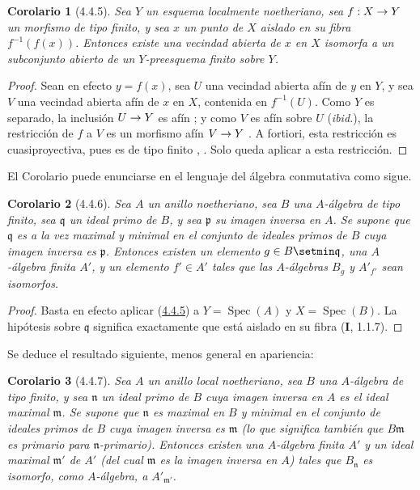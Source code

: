 \documentclass[10pt,oneside,openany]{book}
\theoremstyle{egaenv}\newtheorem*{env}{---}
\theoremstyle{egastatement}
\newtheorem*{corollary}{Corolario}
\theoremstyle{egadescription}
\newcommand{\oldpage}[2][]{\marginnote{\normalfont\scriptsize\textbf{#1}\,|\,#2}\ignorespaces}
\renewcommand{\to}{\mathchoice{\longrightarrow}{\rightarrow}{\rightarrow}{\rightarrow}}
\begin{document}
\begin{corollary}[4.4.5]
\label{III.4.4.5}
\label{III.4.4.5-fr}
Sea $Y$ un esquema localmente noetheriano, sea $f:X\to Y$ un
morfismo de tipo finito, y sea $x$ un punto de $X$ aislado en su fibra
$f^{-1}(f(x))$. Entonces existe una vecindad abierta de $x$ en $X$
isomorfa a un subconjunto abierto de un $Y$-preesquema finito sobre $Y$.
\end{corollary}

\begin{proof}
Sean en efecto $y=f(x)$, sea $U$ una vecindad abierta afín de $y$ en $Y$, y
sea $V$ una vecindad abierta afín de $x$ en $X$, contenida en
$f^{-1}(U)$. Como $Y$ es separado, la inclusión $U\to Y$ es afín
; y como $V$ es afín sobre $U$ (\emph{ibid.}), la
restricción de $f$ a $V$ es un morfismo afín $V\to Y$
. A fortiori, esta restricción es
cuasiproyectiva, pues es de tipo finito
, . Solo queda aplicar
 a esta restricción.
\end{proof}

El Corolario  puede enunciarse en el lenguaje del
álgebra conmutativa como sigue.

\oldpage[III]{137}

\begin{corollary}[4.4.6]
\label{III.4.4.6}
\label{III.4.4.6-fr}
Sea $A$ un anillo noetheriano, sea $B$ una $A$-álgebra de tipo
finito, sea $\mathfrak q$ un ideal primo de $B$, y sea $\mathfrak p$
su imagen inversa en $A$. Se supone que $\mathfrak q$ es a la vez
maximal y minimal en el conjunto de ideales primos de $B$ cuya imagen
inversa es $\mathfrak p$. Entonces existen un elemento
$g\in B\setmin\mathfrak q$, una $A$-álgebra finita $A'$, y un elemento
$f'\in A'$ tales que las $A$-álgebras $B_g$ y $A'_{f'}$ sean isomorfos.
\end{corollary}

\begin{proof}
Basta en efecto aplicar (\hyperref[III.4.4.5-fr]{4.4.5}) a $Y=\operatorname{Spec}(A)$ y $X=\operatorname{Spec}(B)$. La
hipótesis sobre $\mathfrak q$ significa exactamente que está aislado en su fibra
(\textbf{I}, 1.1.7).
\end{proof}

Se deduce el resultado siguiente, menos general en apariencia:

\begin{corollary}[4.4.7]
\label{III.4.4.7}
\label{III.4.4.7-fr}
Sea $A$ un anillo local noetheriano, sea $B$ una $A$-álgebra de tipo
finito, y sea $\mathfrak n$ un ideal primo de $B$ cuya imagen inversa
en $A$ es el ideal maximal $\mathfrak m$. Se supone que $\mathfrak n$
es maximal en $B$ y minimal en el conjunto de ideales primos de $B$
cuya imagen inversa es $\mathfrak m$ (lo que significa también que
$B\mathfrak m$ es primario para $\mathfrak n$-primario). Entonces existen una
$A$-álgebra finita $A'$ y un ideal maximal $\mathfrak m'$ de $A'$ (del cual
$\mathfrak m$ es la imagen inversa en $A$) tales que $B_{\mathfrak n}$ es isomorfo, como $A$-álgebra, a $A'_{\mathfrak m'}$.
\end{corollary}
\end{document}
